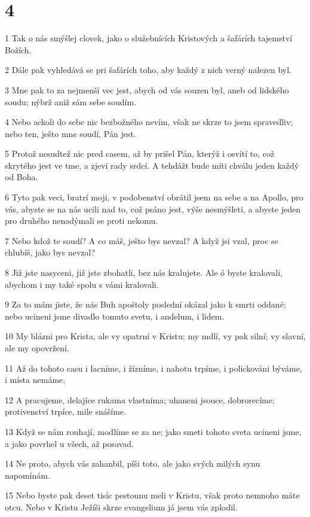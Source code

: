 \chapter{4}

\par 1 Tak o nás smýšlej clovek, jako o služebnících Kristových a šafárích tajemství Božích.
\par 2 Dále pak vyhledává se pri šafárích toho, aby každý z nich verný nalezen byl.
\par 3 Mne pak to za nejmenší vec jest, abych od vás souzen byl, aneb od lidského soudu; nýbrž aniž sám sebe soudím.
\par 4 Nebo ackoli do sebe nic bezbožného nevím, však ne skrze to jsem spravedliv; nebo ten, ješto mne soudí, Pán jest.
\par 5 Protož nesudtež nic pred casem, až by prišel Pán, kterýž i osvítí to, což skrytého jest ve tme, a zjeví rady srdcí. A tehdážt bude míti chválu jeden každý od Boha.
\par 6 Tyto pak veci, bratrí moji, v podobenství obrátil jsem na sebe a na Apollo, pro vás, abyste se na nás ucili nad to, což psáno jest, výše nesmýšleti, a abyste jeden pro druhého nenadýmali se proti nekomu.
\par 7 Nebo kdož te soudí? A co máš, ješto bys nevzal? A když jsi vzal, proc se chlubíš, jako bys nevzal?
\par 8 Již jste nasyceni, již jste zbohatli, bez nás kralujete. Ale ó byste kralovali, abychom i my také spolu s vámi kralovali.
\par 9 Za to mám jiste, že nás Buh apoštoly poslední okázal jako k smrti oddané; nebo ucineni jsme divadlo tomuto svetu, i andelum, i lidem.
\par 10 My blázni pro Krista, ale vy opatrní v Kristu; my mdlí, vy pak silní; vy slavní, ale my opovržení.
\par 11 Až do tohoto casu i lacníme, i žízníme, i nahotu trpíme, i polickováni býváme, i místa nemáme,
\par 12 A pracujeme, delajíce rukama vlastníma; uhaneni jsouce, dobrorecíme; protivenství trpíce, mile snášíme.
\par 13 Když se nám rouhají, modlíme se za ne; jako smeti tohoto sveta ucineni jsme, a jako povrhel u všech, až posavad.
\par 14 Ne proto, abych vás zahanbil, píši toto, ale jako svých milých synu napomínám.
\par 15 Nebo byste pak deset tisíc pestounu meli v Kristu, však proto nemnoho máte otcu. Nebo v Kristu Ježíši skrze evangelium já jsem vás zplodil.
